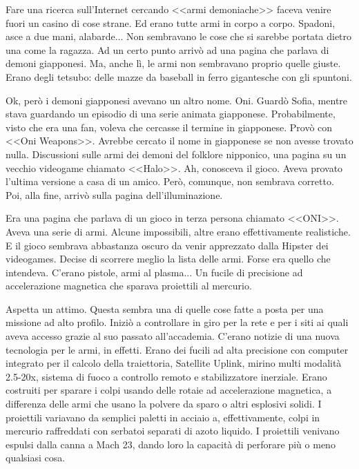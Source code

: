     Fare una ricerca sull'Internet cercando <<armi demoniache>> faceva venire fuori un casino di cose strane. Ed erano
    tutte armi in corpo a corpo. Spadoni, asce a due mani, alabarde... Non sembravano le cose che si sarebbe portata
    dietro una come la ragazza. Ad un certo punto arrivò ad una pagina che parlava di demoni giapponesi. Ma, anche lì,
    le armi non sembravano proprio quelle giuste. Erano degli tetsubo: delle mazze da baseball in ferro gigantesche con
    gli spuntoni.

    Ok, però i demoni giapponesi avevano un altro nome. Oni. Guardò Sofia, mentre stava guardando un episodio di una
    serie animata giapponese. Probabilmente, visto che era una fan, voleva che cercasse il termine in giapponese. Provò
    con <<Oni Weapons>>. Avrebbe cercato il nome in giapponese se non avesse trovato nulla. Discussioni sulle armi dei
    demoni del folklore nipponico, una pagina su un vecchio videogame chiamato <<Halo>>. Ah, conosceva il gioco. Aveva
    provato l'ultima versione a casa di un amico. Però, comunque, non sembrava corretto. Poi, alla fine, arrivò sulla
    pagina dell'illuminazione.

    Era una pagina che parlava di un gioco in terza persona chiamato <<ONI>>. Aveva una serie di armi. Alcune
    impossibili, altre erano effettivamente realistiche. E il gioco sembrava abbastanza oscuro da venir apprezzato dalla
    Hipster dei videogames. Decise di scorrere meglio la lista delle armi. Forse era quello che intendeva. C'erano
    pistole, armi al plasma... Un fucile di precisione ad accelerazione magnetica che sparava proiettili al mercurio.

    Aspetta un attimo. Questa sembra una di quelle cose fatte a posta per una missione ad alto profilo. Iniziò a
    controllare in giro per la rete e per i siti ai quali aveva accesso grazie al suo passato all'accademia. C'erano
    notizie di una nuova tecnologia per le armi, in effetti. Erano dei fucili ad alta precisione con computer integrato
    per il calcolo della traiettoria, Satellite Uplink, mirino multi modalità 2.5-20x, sistema di fuoco a controllo
    remoto e stabilizzatore inerziale. Erano costruiti per sparare
    i colpi usando delle rotaie ad accelerazione magnetica, a differenza delle armi che usano la polvere da sparo o
    altri esplosivi solidi. I proiettili variavano da semplici paletti in acciaio a, effettivamente, colpi in mercurio
    raffreddati con serbatoi separati di azoto liquido. I proiettili venivano espulsi dalla canna a Mach 23, dando loro
    la capacità di perforare più o meno qualsiasi cosa.

